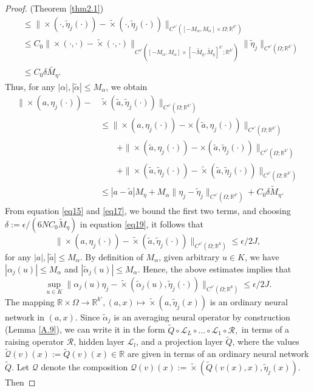 \documentclass[reqno,9pt]{amsart}
\theoremstyle{plain}
\theoremstyle{definition}
\newcommand{\bb}[1]{\mathbb{#1}}
\newcommand{\cal}[1]{\mathcal{#1}}
\begin{document}
\begin{proof}{(Theorem \ref{thm2.1})}
$$\begin{aligned}
        &\leq \|\times(\cdot,\tilde{\eta}_j(\cdot)) - \tilde{\times}(\cdot,\tilde{\eta}_j(\cdot))\|_{C^{s'}([-M_\alpha,M_\alpha] \times \Omega;\bb R^{k'})}\\
        &\leq C_0\|\times(\cdot,\cdot) - \tilde{\times}(\cdot,\cdot)\|_{C^{s'}([-M_\alpha,M_\alpha]\times [-\tilde{M}_\eta,\tilde{M}_\eta]^{k'};\bb R^{k'})} \|\tilde{\eta}_j\|_{C^{s'}(\Omega;\bb R^{k'})}\\
        &\leq C_0 \delta \tilde{M_\eta}.
    \end{aligned}
    $$
    Thus, for any $|\alpha|, |\tilde{\alpha}| \leq M_\alpha$, we obtain
    $$
    \begin{aligned}
        \|\times (a,\eta_j(\cdot)) - &\tilde{\times}(\tilde{a},\tilde{\eta}_j(\cdot))\|_{C^{s'}(\Omega;\bb R^{k'})}\\
        &\leq \|\times (a,\eta_j(\cdot)) - \times(\tilde{a},\eta_j(\cdot))\|_{C^{s'}(\Omega;\bb R^{k'})}\\
        & \qquad + \|\times(\tilde{a},\eta_j(\cdot)) - \times(\tilde{a},\tilde{\eta}_j(\cdot))\|_{C^{s'}(\Omega;\bb R^{k'})}\\
        & \qquad + \|\times(\tilde{a},\tilde{\eta}_j(\cdot)) - \tilde{\times}(\tilde{a},\tilde{\eta}_j(\cdot))\|_{C^{s'}(\Omega;\bb R^{k'})}\\
        & \leq |a-\tilde{a}|M_\eta + M_\alpha\|\eta_j - \tilde{\eta}_j\|_{C^{s'}(\Omega;\bb R^{k'})} + C_0\delta\tilde{M}_\eta.
    \end{aligned}
    $$
From equation \ref{eq15} and \ref{eq17}, we bound the first two terms, and choosing $\delta := \epsilon/(6NC_0\tilde{M}_\eta)$ in equation \ref{eq19}, it follows that 
$$ \|\times(a,\eta_j(\cdot)) - \tilde{\times}(\tilde{a},\tilde{\eta}_j(\cdot))\|_{C^{s'}(\Omega;\bb R^k)} \leq \epsilon/2J,$$
for any $|a|,|\tilde{a}| \leq M_\alpha$. By definition of $M_\alpha$, given arbitrary $u \in K$, we have $|\alpha_j(u)| \leq M_\alpha$ and $|\tilde{\alpha}_j(u)| \leq M_\alpha.$ Hence, the above estimates implies that 
\begin{equation}\label{eq20}
    \sup_{u \in K}\|\alpha_j(u)\eta_j - \tilde{\times}(\tilde{\alpha}_j(u),\tilde{\eta}_j(\cdot))\|_{C^{s'}(\Omega;\bb R^k)} \leq \epsilon/2J.
\end{equation}
The mapping $\bb R\times \Omega \to \bb R^{k'}, (a,x)\mapsto \tilde{\times}(a,\tilde{\eta}_j(x))$ is an ordinary neural network in $(a,x)$. Since $\tilde{\alpha}_j$ is an averaging neural operator by construction (Lemma \ref{A.9}), we can write it in the form $\tilde{Q}\circ\cal L_L \circ\dots\circ\cal L_1 \circ \cal R,$ in terms of a raising operator $\cal R$, hidden layer $\cal L_l$, and a projection layer $\tilde{Q}$, where the values $\tilde{\cal Q}(v)(x) := \tilde{Q}(v)(x) \in \bb R$ are given in terms of an ordinary neural network $\tilde{Q}.$ Let $\cal Q$ denote the composition $\cal Q(v)(x) := \tilde{\times}(\tilde{Q}(v(x),x),\tilde{\eta}_j(x)).$ Then

\end{proof}
\end{document}

